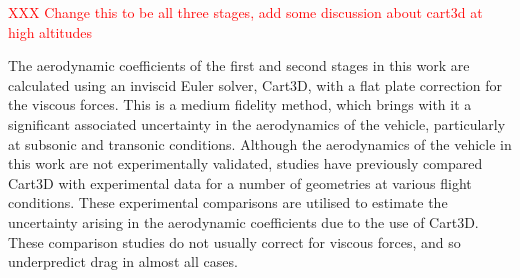 



\textcolor{red}{XXX Change this to be all three stages, add some discussion about cart3d at high altitudes}

The aerodynamic coefficients of the first and second stages in this work are calculated using an inviscid Euler solver, Cart3D, with a flat plate correction for the viscous forces. This is a medium fidelity method, which brings with it a significant associated uncertainty in the aerodynamics of the vehicle, particularly at subsonic and transonic conditions. Although the aerodynamics of the vehicle in this work are not experimentally validated, studies have previously compared Cart3D with experimental data for a number of geometries at various flight conditions. These experimental comparisons are utilised to estimate the uncertainty arising in the aerodynamic coefficients due to the use of Cart3D. These comparison studies do not usually correct for viscous forces, and so underpredict drag in almost all cases.




